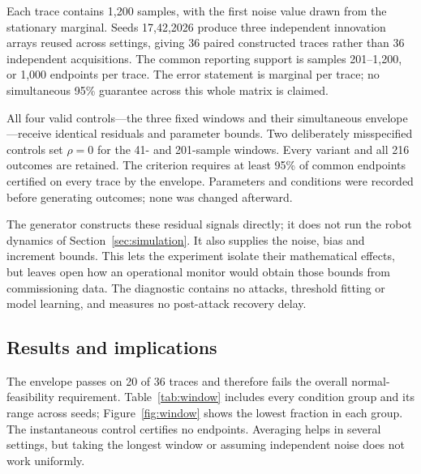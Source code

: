 Each trace contains 1,200 samples, with the first noise value drawn from the stationary marginal. Seeds 17,42,2026 produce three independent innovation arrays reused across settings, giving 36 paired constructed traces rather than 36 independent acquisitions. The common reporting support is samples 201--1,200, or 1,000 endpoints per trace. The error statement is marginal per trace; no simultaneous 95\% guarantee across this whole matrix is claimed.

All four valid controls---the three fixed windows and their simultaneous envelope---receive identical residuals and parameter bounds. Two deliberately misspecified controls set $\rho=0$ for the 41- and 201-sample windows. Every variant and all 216 outcomes are retained. The criterion requires at least 95\% of common endpoints certified on every trace by the envelope. Parameters and conditions were recorded before generating outcomes; none was changed afterward.

The generator constructs these residual signals directly; it does not run the robot dynamics of Section~\ref{sec:simulation}. It also supplies the noise, bias and increment bounds. This lets the experiment isolate their mathematical effects, but leaves open how an operational monitor would obtain those bounds from commissioning data. The diagnostic contains no attacks, threshold fitting or model learning, and measures no post-attack recovery delay.

\subsection{Results and implications}
The envelope passes on 20 of 36 traces and therefore fails the overall normal-feasibility requirement. Table~\ref{tab:window} includes every condition group and its range across seeds; Figure~\ref{fig:window} shows the lowest fraction in each group. The instantaneous control certifies no endpoints. Averaging helps in several settings, but taking the longest window or assuming independent noise does not work uniformly.

\begin{table}[htbp]\centering\small
\caption{Residual diagnostic: simultaneous-envelope certificates on normal synthetic residuals. Each range spans the three seeds, each with 1,000 common endpoints. Passing requires at least 95\% on each trace.}\label{tab:window}
\setlength{\tabcolsep}{5pt}

\end{table}

